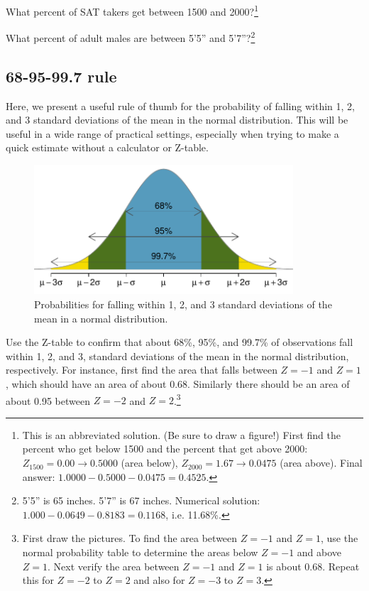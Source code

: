 \begin{exercise}
What percent of SAT takers get between 1500 and 2000?\footnote{This is an abbreviated solution. (Be sure to draw a figure!) First find the percent who get below 1500 and the percent that get above 2000: $Z_{1500} = 0.00 \to 0.5000$ (area below), $Z_{2000} = 1.67 \to 0.0475$ (area above). Final answer: $1.0000-0.5000 - 0.0475 = 0.4525$.}
\end{exercise}

\begin{exercise}
What percent of adult males are between 5'5'' and 5'7''?\footnote{5'5'' is 65 inches. 5'7'' is 67 inches. Numerical solution: $1.000 - 0.0649 - 0.8183 = 0.1168$, i.e. 11.68\%.}
\end{exercise}



\subsection{68-95-99.7 rule}

Here, we present a useful rule of thumb for the probability of falling within 1, 2, and 3 standard deviations of the mean in the normal distribution. This will be useful in a wide range of practical settings, especially when trying to make a quick estimate without a calculator or Z-table.

\begin{figure}[hht]
\centering
\includegraphics[height=1.9in]{ch_distributions/figures/6895997/6895997}
\caption{Probabilities for falling within 1, 2, and 3 standard deviations of the mean in a normal distribution.}
\label{6895997}
\end{figure}

\begin{exercise}
Use the Z-table to confirm that about 68\%, 95\%, and 99.7\% of observations fall within 1, 2, and 3, standard deviations of the mean in the normal distribution, respectively. For instance, first find the area that falls between $Z=-1$ and $Z=1$, which should have an area of about 0.68. Similarly there should be an area of about 0.95 between $Z=-2$ and $Z=2$.\footnote{First draw the pictures. To find the area between $Z=-1$ and $Z=1$, use the normal probability table to determine the areas below $Z=-1$ and above $Z=1$. Next verify the area between $Z=-1$ and $Z=1$ is about 0.68. Repeat this for $Z=-2$ to $Z=2$ and also for $Z=-3$ to $Z=3$.}
\end{exercise}

